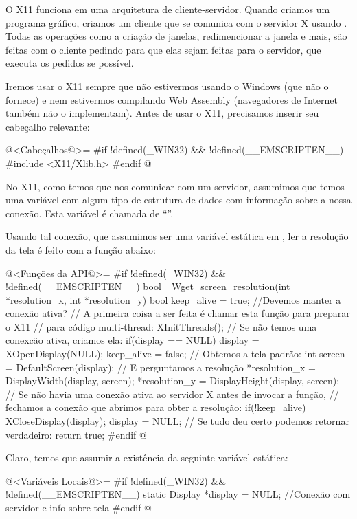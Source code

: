 O X11 funciona em uma arquitetura de cliente-servidor. Quando criamos
um programa gráfico, criamos um cliente que se comunica com o servidor
X usando . Todas as operações como a criação de
janelas, redimencionar a janela e mais, são feitas com o cliente
pedindo para que elas sejam feitas para o servidor, que executa os
pedidos se possível.

Iremos usar o X11 sempre que não estivermos usando o Windows (que não
o fornece) e nem estivermos compilando Web Assembly (navegadores de
Internet também não o implementam). Antes de usar o X11, precisamos
inserir seu cabeçalho relevante:

\iniciocodigo
@<Cabeçalhos@>=
#if !defined(_WIN32) && !defined(__EMSCRIPTEN__)
#include <X11/Xlib.h>
#endif
@
\fimcodigo

No X11, como temos que nos comunicar com um servidor, assumimos que
temos uma variável com algum tipo de estrutura de dados com informação
sobre a nossa conexão. Esta variável é chamada de
``''.

Usando tal conexão, que assumimos ser uma variável estática
em , ler a resolução da tela é feito com a função
abaixo:

\iniciocodigo
@<Funções da API@>=
#if !defined(_WIN32) && !defined(__EMSCRIPTEN__)
bool _Wget_screen_resolution(int *resolution_x, int *resolution_y){
  bool keep_alive = true; //Devemos manter a conexão ativa?
  // A primeira coisa a ser feita é chamar esta função para preparar o X11
  // para código multi-thread:
  XInitThreads();
  // Se não temos uma conexcão ativa, criamos ela:
  if(display == NULL){
    display = XOpenDisplay(NULL);
    keep_alive = false;
  }
  // Obtemos a tela padrão:
  int screen = DefaultScreen(display);
  // E perguntamos a resolução
  *resolution_x = DisplayWidth(display, screen);
  *resolution_y = DisplayHeight(display, screen);
  // Se não havia uma conexão ativa ao servidor X antes de invocar a função,
  // fechamos a conexão que abrimos para obter a resolução:
  if(!keep_alive){
    XCloseDisplay(display);
    display = NULL;
  }
  // Se tudo deu certo podemos retornar verdadeiro:
  return true;
}
#endif
@
\fimcodigo

Claro, temos que assumir a existência da seguinte variável estática:

\iniciocodigo
@<Variáveis Locais@>=
#if !defined(_WIN32) && !defined(__EMSCRIPTEN__)
static Display *display = NULL; //Conexão com servidor e info sobre tela
#endif
@
\fimcodigo

